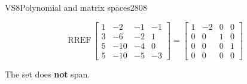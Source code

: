 \begin{exercise}{VS8}{Polynomial and matrix spaces}{2808}
\begin{exerciseAnswer}
 \[
\mathrm{RREF}\, \left[\begin{array}{cccc}
1 & -2 & -1 & -1 \\
3 & -6 & -2 & 1 \\
5 & -10 & -4 & 0 \\
5 & -10 & -5 & -3
\end{array}\right] = \left[\begin{array}{cccc}
1 & -2 & 0 & 0 \\
0 & 0 & 1 & 0 \\
0 & 0 & 0 & 1 \\
0 & 0 & 0 & 0
\end{array}\right]
            \] 

 

 The set does \textbf{not} span. 

 \end{exerciseAnswer}
 \end{exercise}


